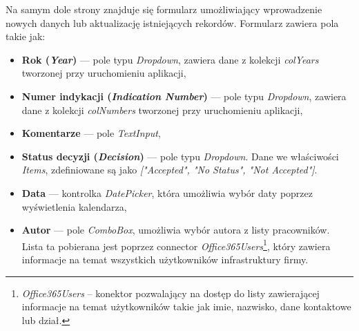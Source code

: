 Na samym dole strony znajduje się formularz umożliwiający wprowadzenie nowych danych lub aktualizację istniejących rekordów. Formularz zawiera pola takie jak:
\begin{itemize}
    \item \textbf{Rok (\emph{Year})} — pole typu \emph{Dropdown}, zawiera dane z kolekcji \emph{colYears} tworzonej przy uruchomieniu aplikacji,
    \item \textbf{Numer indykacji (\emph{Indication Number})} — pole typu \emph{Dropdown}, zawiera dane z kolekcji \emph{colNumbers} tworzonej przy uruchomieniu aplikacji,
    \item \textbf{Komentarze} — pole \emph{TextInput},
    \item \textbf{Status decyzji (\emph{Decision})} — pole typu \emph{Dropdown}. Dane we właściwości \emph{Items}, zdefiniowane są jako \emph{["Accepted", "No Status", "Not Accepted"]}.
    \item \textbf{Data} — kontrolka \emph{DatePicker}, która umożliwia wybór daty poprzez wyświetlenia kalendarza,
    \item \textbf{Autor} — pole \emph{ComboBox}, umożliwia wybór autora z listy pracowników. Lista ta pobierana jest poprzez connector \emph{Office365Users}\footnote{\emph{Office365Users} -- konektor pozwalający na dostęp do listy zawierającej informacje na temat użytkowników takie jak imie, nazwisko, dane kontaktowe lub dział.}, który zawiera informacje na temat wszystkich użytkowników infrastruktury firmy.
\end{itemize}



